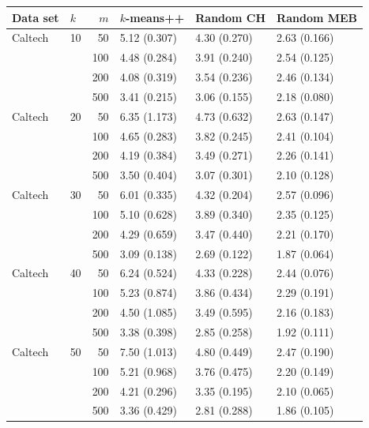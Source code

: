 \begin{longtable}{llrlll} 
\toprule
\parbox[t]{2cm}{Data set} & \parbox[t]{5mm}{$k$} & \parbox[t]{5mm}{$m$} &  \parbox[t]{2cm}{$k$-means++} &  \parbox[t]{2.5cm}{Random CH} &    \parbox[t]{2cm}{Random MEB} \\ 
\midrule
Caltech  & 10 &     50 & 5.12 (0.307) & 4.30 (0.270) &  2.63 (0.166) \\
      &    &    100 & 4.48 (0.284) & 3.91 (0.240) &  2.54 (0.125) \\
      &    &    200 & 4.08 (0.319) & 3.54 (0.236) &  2.46 (0.134) \\
      &    &    500 & 3.41 (0.215) & 3.06 (0.155) &  2.18 (0.080) \\
\midrule
Caltech  & 20 &     50 & 6.35 (1.173) & 4.73 (0.632) &  2.63 (0.147) \\
      &    &    100 & 4.65 (0.283) & 3.82 (0.245) &  2.41 (0.104) \\
      &    &    200 & 4.19 (0.384) & 3.49 (0.271) &  2.26 (0.141) \\
      &    &    500 & 3.50 (0.404) & 3.07 (0.301) &  2.10 (0.128) \\
\midrule
Caltech & 30 &     50 & 6.01 (0.335) & 4.32 (0.204) &  2.57 (0.096) \\
      &    &    100 & 5.10 (0.628) & 3.89 (0.340) &  2.35 (0.125) \\
      &    &    200 & 4.29 (0.659) & 3.47 (0.440) &  2.21 (0.170) \\
      &    &    500 & 3.09 (0.138) & 2.69 (0.122) &  1.87 (0.064) \\
\midrule
Caltech & 40 &     50 & 6.24 (0.524) & 4.33 (0.228) &  2.44 (0.076) \\
      &    &    100 & 5.23 (0.874) & 3.86 (0.434) &  2.29 (0.191) \\
      &    &    200 & 4.50 (1.085) & 3.49 (0.595) &  2.16 (0.183) \\
      &    &    500 & 3.38 (0.398) & 2.85 (0.258) &  1.92 (0.111) \\
\midrule
Caltech & 50 &     50 & 7.50 (1.013) & 4.80 (0.449) &  2.47 (0.190) \\
      &    &    100 & 5.21 (0.968) & 3.76 (0.475) &  2.20 (0.149) \\
      &    &    200 & 4.21 (0.296) & 3.35 (0.195) &  2.10 (0.065) \\
      &    &    500 & 3.36 (0.429) & 2.81 (0.288) &  1.86 (0.105) \\
\bottomrule


\end{longtable}
